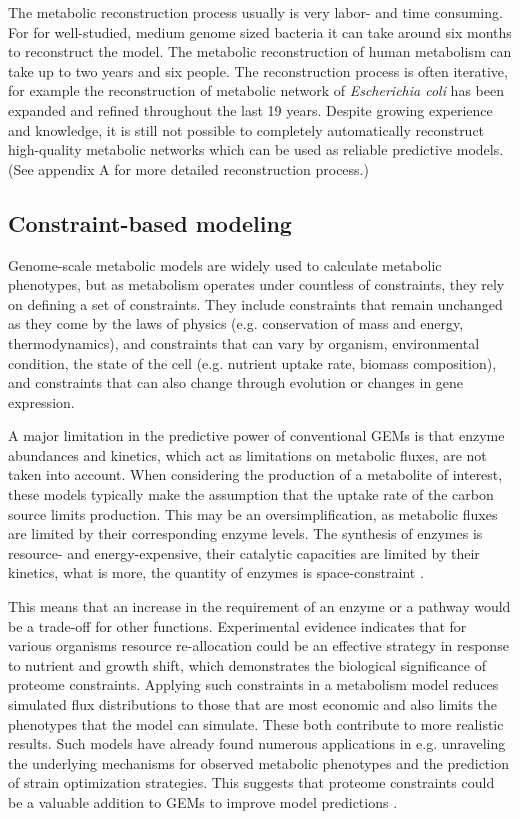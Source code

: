 The metabolic reconstruction process usually is very labor- and time consuming. For for well-studied, medium genome sized bacteria it can take around six months to reconstruct the model. The  
metabolic reconstruction of human metabolism can take up to two years and six people. The reconstruction process is often iterative, for example the reconstruction of metabolic 
network of \textit{Escherichia coli} has been expanded and refined throughout the last 19 years. Despite growing experience and 
knowledge, it is still not possible to completely automatically reconstruct high-quality metabolic networks which can be used as reliable predictive models. \cite{Thiele2010} 
(See appendix A for more detailed reconstruction process.) 


\subsection{Constraint-based modeling}

Genome-scale metabolic models are widely used to calculate metabolic phenotypes, but as metabolism operates under countless of constraints, they rely on defining a set of constraints. 
They include constraints that 
remain unchanged as they come by the laws of physics (e.g. conservation of mass and energy, thermodynamics), 
and constraints that can vary by organism, environmental condition, the state of the 
cell (e.g. nutrient uptake rate, biomass composition), and constraints that can also change through evolution or 
changes in gene expression. \cite{Kerkhoven2022}

A major limitation in the predictive power of conventional GEMs is that enzyme abundances and kinetics, which act as limitations on 
metabolic fluxes, are not taken into account. When considering the production of a metabolite of interest, 
these models typically make the assumption that the uptake rate of the carbon source limits production. 
This may be an oversimplification, as metabolic fluxes are limited by their corresponding enzyme levels. \cite{Sanchez2017}
The synthesis of enzymes is resource- and energy-expensive, their catalytic 
capacities are limited by their kinetics, what is more, the quantity of enzymes is space-constraint \cite{Kerkhoven2022}.

This means that an increase in the requirement of an enzyme or a pathway would be a trade-off for other
functions. Experimental evidence indicates that for various organisms resource re-allocation could be an effective strategy 
in response to nutrient and growth shift, which demonstrates the biological significance 
of proteome constraints. \cite{Chen2023} 
Applying such constraints in a metabolism model reduces simulated flux distributions to those that are most 
economic and also limits the phenotypes that the model can simulate. These both contribute to more realistic results. 
Such models have already found numerous applications in e.g. unraveling the underlying mechanisms for observed metabolic 
phenotypes and the prediction of strain optimization strategies. \cite{Kerkhoven2022}
This suggests that proteome constraints could be a valuable addition to GEMs to
improve model predictions \cite{Chen2023}. 

